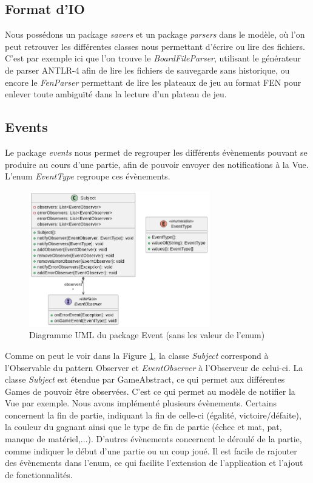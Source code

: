 \documentclass{article}
\begin{document}
\subsection{Format d'IO}
Nous possédons un package \textit{savers} et un package \textit{parsers} dans le modèle, où l'on peut retrouver les différentes classes nous permettant d'écrire ou lire des fichiers.
C'est par exemple ici que l'on trouve le \textit{BoardFileParser}, utilisant le générateur de parser ANTLR-4 afin de lire les fichiers de sauvegarde sans historique, ou encore le \textit{FenParser} permettant
de lire les plateaux de jeu au format FEN pour enlever toute ambiguïté dans la lecture d'un plateau de jeu.

\subsection{Events}
Le package \textit{events} nous permet de regrouper les différents évènements pouvant se produire au cours d'une partie, afin de pouvoir envoyer des notifications à la Vue.
L'enum \textit{EventType} regroupe ces évènements.
\begin{figure}[h]
    \centering
    \includegraphics[width=0.7\textwidth]{uml_event}
    \caption{Diagramme UML du package Event (sans les valeur de l'enum)}
    \label{umlEvents}
\end{figure}
\FloatBarrier
Comme on peut le voir dans la Figure \ref{umlEvents}, la classe \textit{Subject} correspond à l'Observable du pattern Observer et \textit{EventObserver} à l'Observeur de celui-ci.
La classe \textit{Subject} est étendue par GameAbstract, ce qui permet aux différentes Games de pouvoir être observées. C'est ce qui permet au modèle de notifier la Vue par exemple.
Nous avons implémenté plusieurs évènements. Certains concernent la fin de partie, indiquant la fin de celle-ci (égalité, victoire/défaite), la couleur du gagnant ainsi que le type de fin de partie (échec et mat, pat, manque de matériel,...).
D'autres évènements concernent le déroulé de la partie, comme indiquer le début d'une partie ou un coup joué.
Il est facile de rajouter des évènements dans l'enum, ce qui facilite l'extension de l'application et l'ajout de fonctionnalités.
\end{document}
